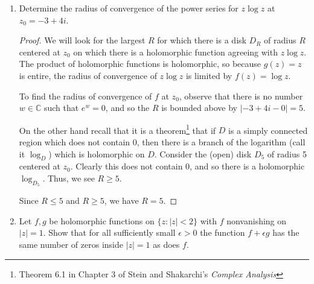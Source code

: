 \documentclass{article}
\begin{document}
\begin{enumerate}
\begin{proof}
		Recall that the integral we \textit{wanted} to compute was the real part of the above integral, but since the integral is real, the real part is the whole integral, and so
		
		\[\int_{-\infty}^\infty \frac{\cos x}{1+x^2} dx = \frac{\pi}{e}\]
		
	\end{proof}
	
	
	\item Determine the radius of convergence of the power series for $z \log z$ at $z_0 = -3 + 4i$.
	
	\begin{proof}
		We will look for the largest $R$ for which there is a disk $D_R$ of radius $R$ centered at $z_0$ on which there is a holomorphic function agreeing with $z \log z$.
		The product of holomorphic functions is holomorphic, so because $g(z) = z$ is entire, the radius of convergence of $z \log z$ is limited by $f(z) = \log z$. 
		
		To find the radius of convergence of $f$ at $z_0$, observe that there is no number $w \in \mathbb{C}$ such that $e^w = 0$, and so the $R$ is bounded above by $|-3 + 4i - 0| = 5$.		
		
		On the other hand recall that it is a theorem\footnote{Theorem 6.1 in Chapter 3 of Stein and Shakarchi's \textit{Complex Analysis}} that if $D$ is a simply connected region which does not contain $0$, then there is a branch of the logarithm (call it $\log_D$) which is holomorphic on $D$. Consider the (open) disk $D_5$ of radius 5 centered at $z_0$. Clearly this does not contain $0$, and so there is a holomorphic $\log_{D_5}$. Thus, we see $R \geq 5$. 
		
		Since $R \leq 5$ and $R \geq 5$, we have $R = 5$.
	\end{proof}
	
	\newpage
	
	\item Let $f,g$ be holomorphic functions on $\{z : |z| < 2\}$ with $f$ nonvanishing on $|z| = 1$. Show that for all sufficiently small $\epsilon>0$ the function $f+ \epsilon g$ has the same number of zeros inside $|z| = 1$ as does $f$. 


\end{enumerate}
\end{document}
